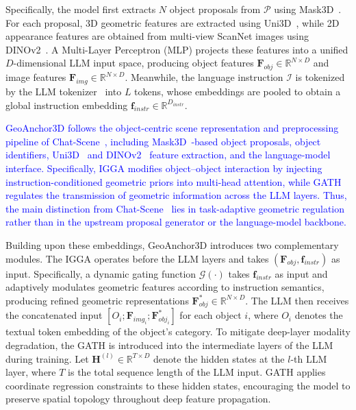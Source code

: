 \documentclass[lettersize,journal]{IEEEtran}
\begin{document}
Specifically, the model first extracts $N$ object proposals from $\mathcal{P}$ using Mask3D~\cite{mask3d2023}. For each proposal, 3D geometric features are extracted using Uni3D~\cite{uni3d2024}, while 2D appearance features are obtained from multi-view ScanNet images using DINOv2~\cite{dinov22023}. A Multi-Layer Perceptron (MLP) projects these features into a unified $D$-dimensional LLM input space, producing object features $\mathbf{F}_{obj} \in \mathbb{R}^{N \times D}$ and image features $\mathbf{F}_{img} \in \mathbb{R}^{N \times D}$. Meanwhile, the language instruction $\mathcal{I}$ is tokenized by the LLM tokenizer~\cite{llama2023} into $L$ tokens, whose embeddings are pooled to obtain a global instruction embedding $\mathbf{f}_{instr} \in \mathbb{R}^{D_{instr}}$. 

\textcolor{blue}{GeoAnchor3D follows the object-centric scene representation and preprocessing pipeline of Chat-Scene~\cite{chatscene2024}, including Mask3D~\cite{mask3d2023}-based object proposals, object identifiers, Uni3D~\cite{uni3d2024} and DINOv2~\cite{dinov22023} feature extraction, and the language-model interface. Specifically, IGGA modifies object--object interaction by injecting instruction-conditioned geometric priors into multi-head attention, while GATH regulates the transmission of geometric information across the LLM layers. Thus, the main distinction from Chat-Scene~\cite{chatscene2024} lies in task-adaptive geometric regulation rather than in the upstream proposal generator or the language-model backbone.}

Building upon these embeddings, GeoAnchor3D introduces two complementary modules. The IGGA operates before the LLM layers and takes $(\mathbf{F}_{obj}, \mathbf{f}_{instr})$ as input. Specifically, a dynamic gating function $\mathcal{G}(\cdot)$ {takes $\mathbf{f}_{instr}$ as input} and adaptively modulates geometric features according to instruction semantics, producing refined geometric representations $\mathbf{F}_{obj}^{*} \in \mathbb{R}^{N \times D}$. The LLM then receives the concatenated input $[O_i; \mathbf{F}_{img_i}; \mathbf{F}_{obj_i}^{*}]$ for each object $i$, where $O_i$ denotes the textual token embedding of the object's category. To mitigate deep-layer {modality} degradation, the GATH is introduced into the intermediate layers of the LLM during training. Let $\mathbf{H}^{(l)} \in \mathbb{R}^{T \times D}$ denote the hidden states at the $l$-th LLM layer, where $T$ is the total sequence length of the LLM input. GATH applies coordinate regression constraints to these hidden states, encouraging the model to preserve spatial topology throughout deep feature propagation.
\end{document}
